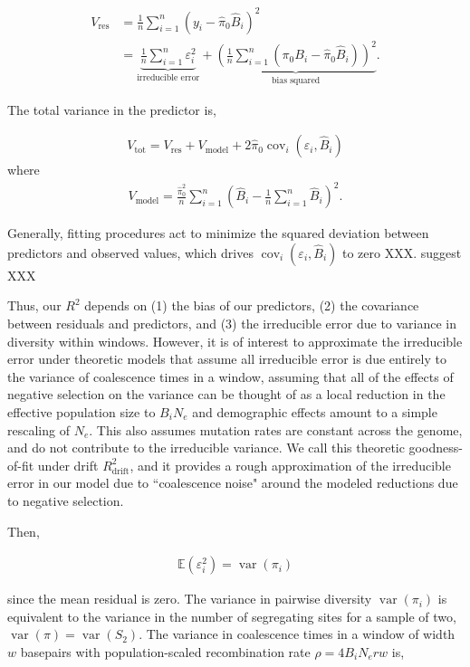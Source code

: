 \documentclass[11pt]{article}
\newcommand{\E}{\mathbb{E}}
\DeclareMathOperator{\var}{var}
\DeclareMathOperator{\cov}{cov}
\begin{document}
\begin{align}
    V_\text{res} &= \frac{1}{n} \sum_{i=1}^n (y_i - \widehat{\pi}_0 \widehat{B}_i)^2  \\
                 &= \underbrace{\frac{1}{n} \sum_{i=1}^n \varepsilon_i^2}_\text{irreducible error} + \underbrace{\left(\frac{1}{n} \sum_{i=1}^n (\pi_0 B_i - \widehat{\pi}_0 \widehat{B}_i)\right)^2}_\text{bias squared}.
\end{align}

The total variance in the predictor is,

\begin{align}
    V_\text{tot} = V_\text{res} + V_\text{model} + 2\widehat{\pi}_0\cov_i(\varepsilon_i, \widehat{B}_i)
\end{align}
where 
\begin{align}
    V_\text{model} = \frac{\widehat{\pi}_0^2}{n} \sum_{i=1}^n \left(\widehat{B}_i - \frac{1}{n}\sum_{i=1}^n\widehat{B}_i\right)^2.
\end{align}

Generally, fitting procedures act to minimize the squared deviation between
predictors and observed values, which drives $\cov_i(\varepsilon_i,
\widehat{B}_i)$ to zero XXX. \textcite{Murphy2022-sj} suggest  XXX 

Thus, our $R^2$ depends on (1) the bias of our predictors, (2) the covariance
between residuals and predictors, and (3) the irreducible error due to variance
in diversity within windows. However, it is of interest to approximate the
irreducible error under theoretic models that assume all irreducible error is
due entirely to the variance of coalescence times in a window, assuming that
all of the effects of negative selection on the variance can be thought of as a
local reduction in the effective population size to $B_i N_e$ and demographic
effects amount to a simple rescaling of $N_e$. This also assumes mutation rates
are constant across the genome, and do not contribute to the irreducible
variance. We call this theoretic goodness-of-fit under drift
$R_\text{drift}^2$, and it provides a rough approximation of the irreducible
error in our model due to ``coalescence noise" around the modeled reductions
due to negative selection.

Then, 

\begin{align}
    \E(\varepsilon_i^2) = \var(\pi_i)
\end{align}

since the mean residual is zero. The variance in pairwise diversity
$\var(\pi_i)$ is equivalent to the variance in the number of segregating sites
for a sample of two, $\var(\pi) = \var(S_2)$. The variance in coalescence times
in a window of width $w$ basepairs with population-scaled recombination rate
$\rho = 4 B_i N_e r w$ is,
\end{document}
